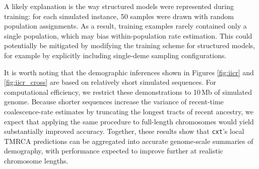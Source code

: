 \documentclass{article}
\newcommand{\cxtkit}{\texttt{cxt}\xspace}
\begin{document}
A likely explanation is the way structured models were represented during training:
for each simulated instance, 50 samples were drawn with random population assignments.
As a result, training examples rarely contained only a single population,
which may bias within-population rate estimation.
This could potentially be mitigated by modifying the training scheme for structured models,
for example by explicitly including single-deme sampling configurations.

It is worth noting that the demographic inferences shown in Figures \ref{fig:iicr} and \ref{fig:iicr_cross}
are based on relatively short simulated sequences.
For computational efficiency, we restrict these demonstrations to 10\,Mb of 
simulated genome.
Because shorter sequences increase the variance of recent-time coalescence-rate estimates by truncating the longest tracts of recent ancestry, 
we expect that applying the same procedure to full-length chromosomes would yield substantially improved accuracy.
Together, these results show that \cxtkit's local TMRCA predictions can be
aggregated into accurate genome-scale summaries of demography, with performance
expected to improve further at realistic chromosome lengths.
\end{document}
